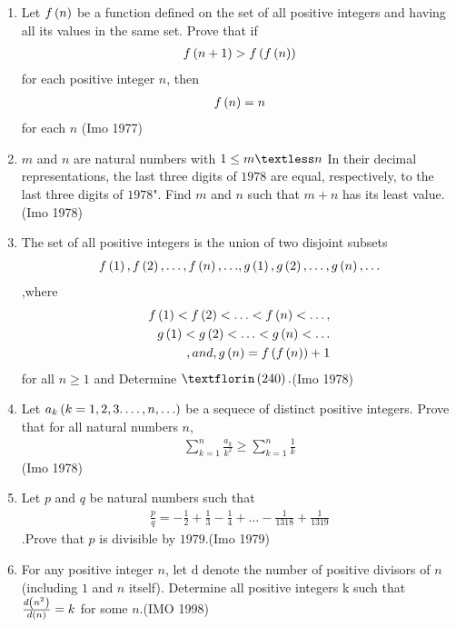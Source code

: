 \begin{enumerate}
\item	Let $f\left(n\right)$ be a function defined on the set of all positive integers and having all its values in the same set. Prove that if \begin{align}f\left(n + 1\right) > f\left(f\left(n\right)\right)\end{align} for each positive integer $n$, then \begin{align}f\left(n\right) = n\end{align} for each $n$
		\hfill(Imo 1977)

	\item $m$ and $n$ are natural numbers with $1 \leq m \textless n$ In their decimal representations, the last three digits of $1978$ are equal, respectively, to the last three digits of $1978$". Find $m$ and $n$ such that $m+n$ has its least value.\hfill(Imo 1978)

\item The set of all positive integers is the union of two disjoint subsets 
\begin{align}
{f\ensuremath{\left(1\right)}, f\ensuremath{\left(2\right)} ,\ldots,f\ensuremath{\left(n\right)},\ldots} ,{ g\left(1\right),g\left(2\right),\ldots,g\left(n\right),\ldots} 
\end{align},where
\begin{align}
f\left(1\right)< f\left(2\right) < \ldots < f\left(n\right) < \ldots,\\ g\left(1\right) < g\left(2\right) < \ldots < g\left(n\right)< \ldots\\, and,   g\left(n\right)=f\left(f\left(n\right)\right) + 1
\end{align}
for all $n \geq 1$ and Determine $ƒ\brak{240}.$\hfill(Imo 1978)

\item Let ${a_{k}\left(k=1,2,3.\ldots,n,\ldots\right)}$ be a sequece of distinct positive integers. Prove that for all natural numbers $n$,\begin{align}\sum_{k=1}^{n} \frac{a_{k}}{k^2} \geq \sum_{k=1}^{n} \frac{1}{k}\end{align}\hfill(Imo 1978)

\item Let $p$ and $q$ be natural numbers such that \begin{align}\frac{p}{q}=-\frac{1}{2}+\frac{1}{3}-\frac{1}{4}+\ldots -\frac{1}{1318}+\frac{1}{1319}\end{align}.Prove that $p$ is divisible by $1979$.\hfill(Imo 1979)

\item For any positive integer $n$, let d{} denote the number of positive divisors of $n$ (including $1$ and $n$ itself). Determine all positive integers k such that $ \frac{d\left(n^2\right)} {d\left(n\right)}  = k$ for some $n$.\hfill(IMO 1998) 


\end{enumerate}
